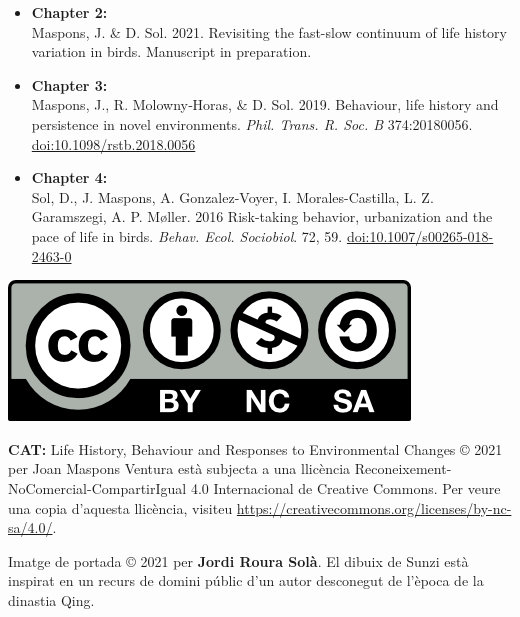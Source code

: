 \documentclass[12pt,a4paper,twoside,fleqn]{memoir}
\begin{document}
\begin{itemize}
  \item \textbf{Chapter 2:} \\
  Maspons, J. \& D. Sol. 2021. Revisiting the fast-slow continuum of life history variation in birds. Manuscript in preparation.
  
  \item \textbf{Chapter 3:} \\
  Maspons, J., R. Molowny‐Horas, \& D. Sol. 2019. Behaviour, life history and persistence in novel environments. \textit{Phil. Trans. R. Soc. B} 374:20180056. \href{http://dx.doi.org/10.1098/rstb.2018.0056}{doi:10.1098/rstb.2018.0056}
  
  \item \textbf{Chapter 4:} \\
  Sol, D., J. Maspons, A. Gonzalez-Voyer, I. Morales-Castilla, L. Z. Garamszegi, A. P. M\o{}ller. 2016 Risk-taking behavior, urbanization and the pace of life in birds. \textit{Behav. Ecol. Sociobiol}. 72, 59. \href{http://dx.doi.org/10.1007/s00265-018-2463-0}{doi:10.1007/s00265-018-2463-0}

\end{itemize}

\bigskip

\begin{center}
 \includegraphics{./Figures/intro/CC_BY-NC-SA.png}
\end{center}


\textbf{CAT:} Life History, Behaviour and Responses to Environmental Changes
© 2021 per Joan Maspons Ventura està subjecta a una llicència
Reconeixement-NoComercial-CompartirIgual 4.0 Internacional de Creative Commons.
Per veure una copia d'aquesta llicència, visiteu
\url{https://creativecommons.org/licenses/by-nc-sa/4.0/}.

Imatge de portada © 2021 per \textbf{Jordi Roura Solà}. El dibuix de Sunzi està
inspirat en un recurs de domini públic d'un autor desconegut de l'època de la
dinastia Qing.
\end{document}
